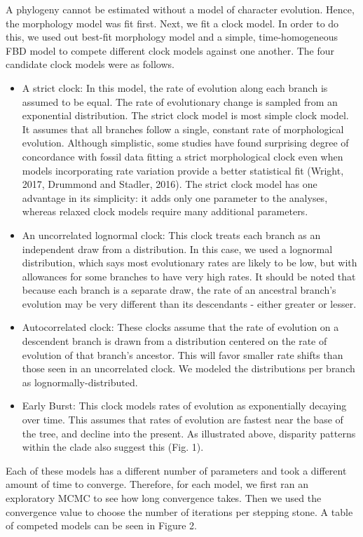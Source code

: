 \documentclass{article}
\begin{document}
A phylogeny cannot be estimated without a model of character evolution. 
Hence, the morphology model was fit first.
Next, we fit a clock model. 
In order to do this, we used out best-fit morphology model and a simple, time-homogeneous FBD model to compete different clock models against one another.
The four candidate clock models were as follows.
\begin{itemize}
    \item A strict clock: In this model, the rate of evolution along each branch is assumed to be equal. The rate of evolutionary change is sampled from an exponential distribution. 
    The strict clock model is most simple clock model. 
    It assumes that all branches follow a single, constant rate of morphological evolution. 
    Although simplistic, some studies have found surprising degree of concordance with fossil data fitting a strict morphological clock even when models incorporating rate variation provide a better statistical fit (Wright, 2017, Drummond and Stadler, 2016). 
    The strict clock model has one advantage in its simplicity: it adds only one parameter to the analyses, whereas relaxed clock models require many additional parameters.
    \item An uncorrelated lognormal clock: This clock treats each branch as an independent draw from a distribution.  
    In this case, we used a lognormal distribution, which says most evolutionary rates are likely to be low, but with allowances for some branches to have very high rates. 
    It should be noted that because each branch is a separate draw, the rate of an ancestral branch's evolution may be very different than its descendants - either greater or lesser.
    \item Autocorrelated clock: These clocks assume that the rate of evolution on a descendent branch is drawn from a distribution centered on the rate of evolution of that branch's ancestor. 
    This will favor smaller rate shifts than those seen in an uncorrelated clock. 
    We modeled the distributions per branch as lognormally-distributed.
    \item Early Burst: This clock models rates of evolution as exponentially decaying over time. 
    This assumes that rates of evolution are fastest near the base of the tree, and decline into the present. 
    As illustrated above, disparity patterns within the clade also suggest this (Fig. 1).
\end{itemize}

Each of these models has a different number of parameters and took a different amount of time to converge. Therefore, for each model, we first ran an exploratory MCMC to see how long convergence takes. Then we used the convergence value to choose the number of iterations per stepping stone.
A table of competed models can be seen in Figure 2.
\end{document}
